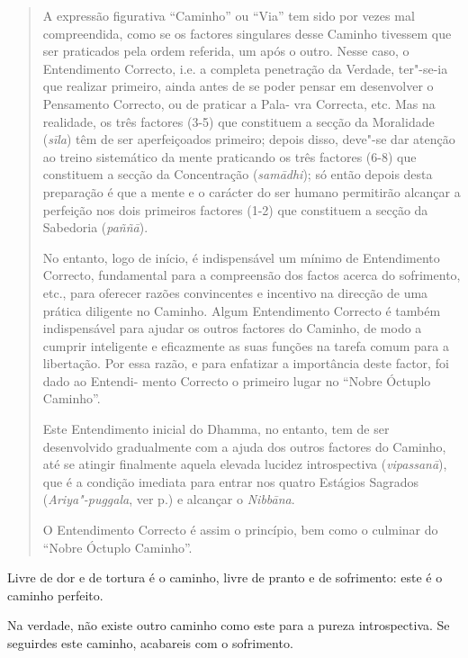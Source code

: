 \begin{quote}
  A expressão figurativa “Caminho” ou “Via” tem sido por vezes mal
  compreendida, como se os factores singulares desse Caminho tivessem que ser
  praticados pela ordem referida, um após o outro. Nesse caso, o Entendimento
  Correcto, i.e. a completa penetração da Verdade, ter"-se-ia que realizar
  primeiro, ainda antes de se poder pensar em desenvolver o Pensamento Correcto,
  ou de praticar a Pala- vra Correcta, etc. Mas na realidade, os três factores
  (3-5) que constituem a secção da Moralidade (\emph{sīla}) têm de ser
  aperfeiçoados primeiro; depois disso, deve"-se dar atenção ao treino
  sistemático da mente praticando os três factores (6-8) que constituem a secção
  da Concentração (\emph{samādhi}); só então depois desta preparação é que a
  mente e o carácter do ser humano permitirão alcançar a perfeição nos dois
  primeiros factores (1-2) que constituem a secção da Sabedoria (\emph{paññā}).

  No entanto, logo de início, é indispensável um mínimo de Entendimento
  Correcto, fundamental para a compreensão dos factos acerca do sofrimento,
  etc., para oferecer razões convincentes e incentivo na direcção de uma prática
  diligente no Caminho. Algum Entendimento Correcto é também indispensável para
  ajudar os outros factores do Caminho, de modo a cumprir inteligente e
  eficazmente as suas funções na tarefa comum para a libertação. Por essa razão,
  e para enfatizar a importância deste factor, foi dado ao Entendi- mento
  Correcto o primeiro lugar no “Nobre Óctuplo Caminho”.

  Este Entendimento inicial do Dhamma, no entanto, tem de ser desenvolvido
  gradualmente com a ajuda dos outros factores do Caminho, até se atingir
  finalmente aquela elevada lucidez introspectiva (\emph{vipassanā}), que é a
  condição imediata para entrar nos quatro Estágios Sagrados (\emph{Ariya"-puggala}, ver p.\pageref{ariya-puggala}) e alcançar o \emph{Nibbāna}.

  O Entendimento Correcto é assim o princípio, bem como o culminar do “Nobre Óctuplo Caminho”.
\end{quote}

\bigskip

Livre de dor e de tortura é o caminho, livre de pranto e de sofrimento: este é o
caminho perfeito.


Na verdade, não existe outro caminho como este para a pureza introspectiva. Se
seguirdes este caminho, acabareis com o sofrimento.

